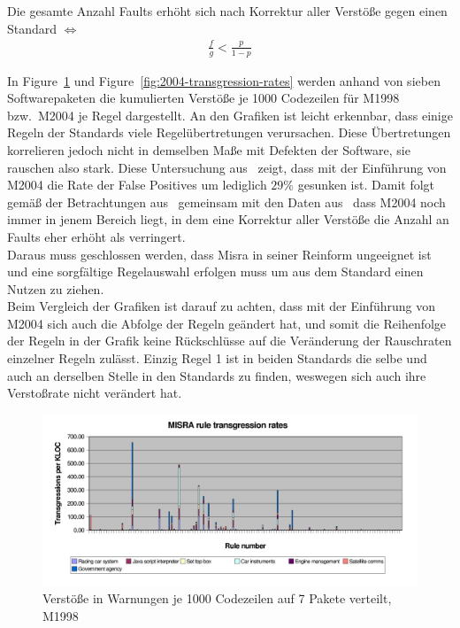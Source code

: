 \documentclass[a4paper,UKenglish,cleveref, autoref]{templates/lipics-v2019}
\begin{document}
    \begin{theorem}
        Die gesamte Anzahl Faults erhöht sich nach Korrektur aller Verstöße gegen einen Standard $\iff$
        \begin{gather*}
            \frac{f}{g} < \frac{p}{1-p}
        \end{gather*}
    \end{theorem}


    In Figure~\ref{fig:1998-transgression-rates} und Figure~\ref{fig:2004-transgression-rates} werden anhand von sieben
    Softwarepaketen die kumulierten Verstöße je 1000 Codezeilen für M1998 bzw.\ M2004 je Regel dargestellt.
    An den Grafiken ist leicht erkennbar, dass einige Regeln der Standards viele Regelübertretungen verursachen.
    Diese Übertretungen korrelieren jedoch nicht in demselben Maße mit Defekten der Software, sie rauschen also stark.
    Diese Untersuchung aus~\cite{hatton2007language} zeigt, dass mit der Einführung von M2004 die Rate der False Positives
    um lediglich $29\%$ gesunken ist.
    Damit folgt gemäß der Betrachtungen aus~\cite{hatton2007language} gemeinsam mit den Daten aus~\cite{transgression-data}
    dass M2004 noch immer in jenem Bereich liegt, in dem eine Korrektur aller Verstöße die Anzahl an Faults
    eher erhöht als verringert.\\
    Daraus muss geschlossen werden, dass Misra in seiner Reinform ungeeignet ist und eine sorgfältige Regelauswahl erfolgen
    muss um aus dem Standard einen Nutzen zu ziehen.\\
    Beim Vergleich der Grafiken ist darauf zu achten, dass mit der Einführung von M2004 sich auch die Abfolge der Regeln
    geändert hat, und somit die Reihenfolge der Regeln in der Grafik keine Rückschlüsse auf die Veränderung der
    Rauschraten einzelner Regeln zulässt.
    Einzig Regel 1 ist in beiden Standards die selbe und auch an derselben Stelle in den Standards zu finden, weswegen sich
    auch ihre Verstoßrate nicht verändert hat.

    \begin{figure}[H]
        \centering
        \captionsetup{justification=centering,margin=2cm}
        \includegraphics[width=\textwidth]{graphics/1998-transgression-rates.png}
        \caption{Verstöße in Warnungen je 1000 Codezeilen auf 7 Pakete verteilt, M1998\cite{hatton2007language}}
        \label{fig:1998-transgression-rates}
    \end{figure}
\end{document}
